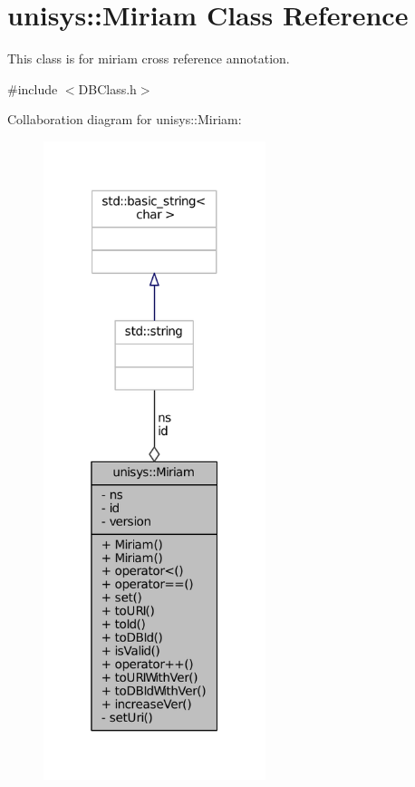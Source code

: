 \hypertarget{classunisys_1_1Miriam}{\section{unisys\-:\-:Miriam Class Reference}
\label{classunisys_1_1Miriam}
}


This class is for miriam cross reference annotation.  




{\ttfamily \#include $<$D\-B\-Class.\-h$>$}



Collaboration diagram for unisys\-:\-:Miriam\-:
\nopagebreak
\begin{figure}[H]
\begin{center}
\leavevmode
\includegraphics[width=184pt]{classunisys_1_1Miriam__coll__graph}
\end{center}
\end{figure}
